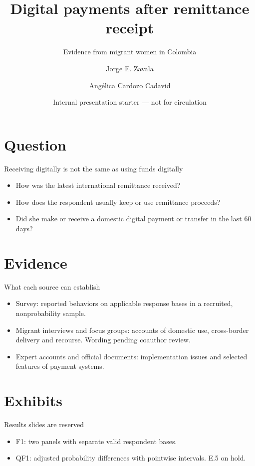 \documentclass[aspectratio=169,10pt]{beamer}
\title[Digital payments and remittances]{Digital payments after remittance receipt}
\subtitle{Evidence from migrant women in Colombia}
\author[Zavala and Cardozo]{Jorge E. Zavala \and Angélica Cardozo Cadavid}
\date{Internal presentation starter --- not for circulation}
\begin{document}
\ZavalaTitle
\section{Question}
\begin{frame}{Receiving digitally is not the same as using funds digitally}
  \begin{itemize}
    \item How was the latest international remittance received?
    \item How does the respondent usually keep or use remittance proceeds?
    \item Did she make or receive a domestic digital payment or transfer in the last 60 days?
  \end{itemize}
\end{frame}
\section{Evidence}
\begin{frame}{What each source can establish}
  \begin{itemize}
    \item Survey: reported behaviors on applicable response bases in a recruited, nonprobability sample.
    \item Migrant interviews and focus groups: accounts of domestic use, cross-border delivery and recourse. Wording pending coauthor review.
    \item Expert accounts and official documents: implementation issues and selected features of payment systems.
  \end{itemize}
\end{frame}
\section{Exhibits}
\begin{frame}{Results slides are reserved}
  \begin{itemize}
    \item F1: two panels with separate valid respondent bases.
    \item QF1: adjusted probability differences with pointwise intervals. E.5 on hold.
  \end{itemize}
\end{frame}
\end{document}
